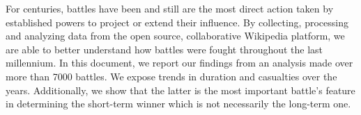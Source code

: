 For centuries, battles have been and still are the most direct action taken by established powers to project or extend their influence. By collecting, processing and analyzing data from the open source, collaborative Wikipedia platform, we are able to better understand how battles were fought throughout the last millennium. In this document, we report our findings from an analysis made over more than 7000 battles. We expose trends in duration and casualties over the years. Additionally, we show that the latter is the most important battle's feature in determining the short-term winner which is not necessarily the long-term one.